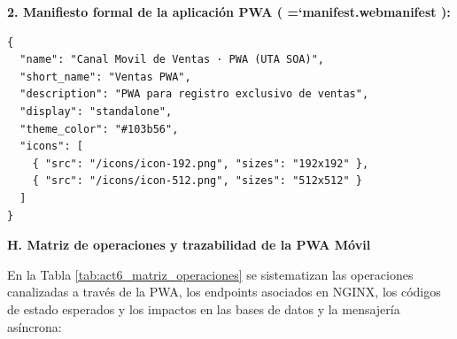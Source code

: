 \documentclass[11pt,a4paper]{article}
\renewcommand{\_}{\oldunderscore\allowbreak}
\DeclareRobustCommand{\texttt}[1]{%
  {\upshape\ttfamily\fontsize{9}{10.8}\selectfont\hyphenchar\font=`\-\relax #1}%
}
\begin{document}
\vspace{0.1cm}
\noindent\textbf{2. Manifiesto formal de la aplicación PWA (\texttt{manifest.\allowbreak{}webmanifest}):}
\begin{lstlisting}
{
  "name": "Canal Movil de Ventas · PWA (UTA SOA)",
  "short_name": "Ventas PWA",
  "description": "PWA para registro exclusivo de ventas",
  "display": "standalone",
  "theme_color": "#103b56",
  "icons": [
    { "src": "/icons/icon-192.png", "sizes": "192x192" },
    { "src": "/icons/icon-512.png", "sizes": "512x512" }
  ]
}
\end{lstlisting}

\vspace{0.2cm}
\noindent\textbf{H. Matriz de operaciones y trazabilidad de la PWA Móvil}

\noindent En la Tabla \ref{tab:act6_matriz_operaciones} se sistematizan las operaciones canalizadas a través de la PWA, los endpoints asociados en NGINX, los códigos de estado esperados y los impactos en las bases de datos y la mensajería asíncrona:
\end{document}

